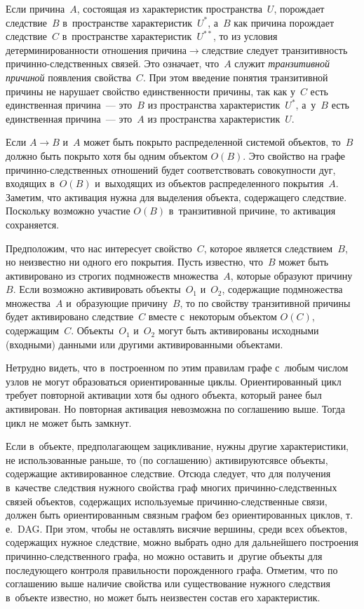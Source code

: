 \begin{multicols}{2}
   Если причина~$A$, состоящая из характеристик пространства~$U$, порождает 
следствие~$B$ в~пространстве характеристик~$U^*$, а~$B$ как причина 
порождает следствие~$C$ в~пространстве характеристик~$U^{**}$, то из условия 
детерминированности отношения при\-чи\-на\;$\to$\;след\-ст\-вие следует 
транзитивность при\-чин\-но-след\-ст\-вен\-ных связей. Это означает, что~$A$ 
служит \textit{транзитивной причиной} появления свойства~$C$. При этом 
введение понятия транзитивной причины не нарушает свойство единственности 
причины, так как у~$C$ есть единственная причина~--- это~$B$ из пространства 
характеристик~$U^*$, а~у~$B$ есть единственная причина~--- это~$A$ из 
пространства характеристик~$U$. 
  
  Если $A\to B$ и~$A$ может быть покрыто распределенной сис\-те\-мой 
объектов, то~$B$ должно быть покрыто хотя бы одним объектом $O(B)$. Это 
свойство на графе при\-чин\-но-след\-ст\-вен\-ных отношений будет 
соответствовать совокупности дуг, входящих в~$O(B)$ и~выходящих из объектов 
распределенного покрытия~$A$. Заметим, что активация нужна для выделения 
объекта, содержащего следствие. Поскольку возможно участие $O(B)$ 
в~транзитивной причине, то активация сохраняется. 
  
  Предположим, что нас интересует свойство~$C$, которое является 
следствием~$B$, но неизвестно ни одного его покрытия. Пусть известно, что~$B$ 
может быть активировано из строгих подмножеств множества~$A$, которые 
образуют причину~$B$. Если возможно активировать объекты~$O_1$ и~$O_2$, 
содержащие подмножества множества~$A$ и~образующие причину~$B$, то по 
свойству транзитивной причины будет активировано следствие~$C$ вместе 
с~некоторым объектом $O(C)$, содержащим~$C$. Объекты~$O_1$ и~$O_2$ могут 
быть активированы исходными (входными) данными или другими 
активированными объек\-тами.
{

} 
  
  Нетрудно видеть, что в~построенном по этим правилам графе с~любым числом 
узлов не могут образоваться ориентированные циклы. Ориентированный цикл 
требует повторной активации хотя бы одного объекта, который ранее был 
активирован. Но повторная активация невозможна по соглашению выше. Тогда 
цикл не может быть замкнут. 

  
  Если в~объекте, предполагающем зацикливание, нужны другие характеристики, 
не использованные раньше, то (по соглашению) активируются\linebreak все объекты, 
содержащие активированное следствие. Отсюда следует, что для получения 
в~качестве следствия нужного свойства граф многих  
при\-чин\-но-след\-ст\-вен\-ных связей объектов, содержащих используемые  
при\-чин\-но-след\-ст\-вен\-ные связи, должен быть ориентированным связным 
графом без ориентированных циклов, т.\,е.\ DAG. При этом, чтобы не оставлять 
висячие вершины, среди всех объектов, содержащих нужное следствие, можно 
выбрать одно для дальнейшего построения  
при\-чин\-но-след\-ст\-вен\-но\-го графа, но можно оставить и~другие объекты для 
последующего контроля правильности порожденного графа. Отметим, что по 
соглашению выше наличие свойства или существование нужного следствия 
в~объекте известно, но может быть неизвестен состав его характеристик.
{

}
\end{multicols}
